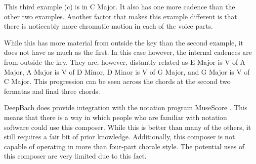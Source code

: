 This third example (c) is in C Major.  It also has one more cadence than the other two examples.  Another factor that makes this example different is that there is noticeably more chromatic motion in each of the voice parts.

\vspace{\baselineskip}

While this has more material from outside the key than the second example, it does not have as much as the first.  In this case however, the internal cadences are from outside the key.  They are, however, distantly related as E Major is V of A Major, A Major is V of D Minor, D Minor is V of G Major, and G Major is V of C Major.  This progression can be seen across the chords at the second two fermatas and final three chords.

\vspace{\baselineskip}

DeepBach does provide integration with the notation program MuseScore \cite{Hadjeres_2016}.  This means that there is a way in which people who are familiar with notation software could use this composer.  While this is better than many of the others, it still requires a fair bit of prior knowledge.  Additionally, this composer is not capable of operating in more than four-part chorale style.  The potential uses of this composer are very limited due to this fact.